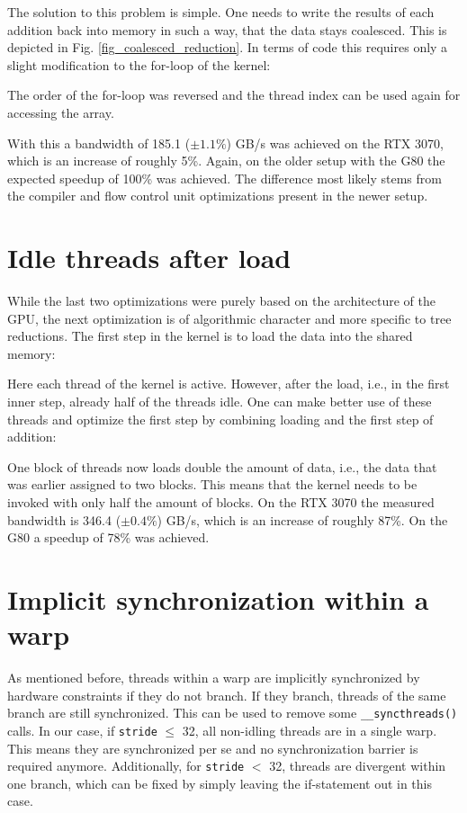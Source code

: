 The solution to this problem is simple.
One needs to write the results of each addition back into memory in such a way, that the data stays coalesced.
This is depicted in Fig. \ref{fig_coalesced_reduction}.
In terms of code this requires only a slight modification to the for-loop of the kernel:

The order of the for-loop was reversed and the thread index can be used again for accessing the array.

With this a bandwidth of 185.1 (\( \pm 1.1\% \)) GB/s was achieved on the RTX 3070, which is an increase of roughly 5\%.
Again, on the older setup with the G80 the expected speedup of 100\% was achieved.
The difference most likely stems from the compiler and flow control unit optimizations present in the newer setup.


\section{Idle threads after load}
While the last two optimizations were purely based on the architecture of the GPU, the next optimization is of algorithmic character and more specific to tree reductions.
The first step in the kernel is to load the data into the shared memory:

Here each thread of the kernel is active.
However, after the load, i.e., in the first inner step, already half of the threads idle.
One can make better use of these threads and optimize the first step by combining loading and the first step of addition:

One block of threads now loads double the amount of data, i.e., the data that was earlier assigned to two blocks.
This means that the kernel needs to be invoked with only half the amount of blocks.
On the RTX 3070 the measured bandwidth is 346.4 (\( \pm 0.4\% \)) GB/s, which is an increase of roughly 87\%.
On the G80 a speedup of 78\% was achieved.


\section{Implicit synchronization within a warp}
As mentioned before, threads within a warp are implicitly synchronized by hardware constraints if they do not branch.
If they branch, threads of the same branch are still synchronized.
This can be used to remove some \texttt{\_\_syncthreads()} calls.
In our case, if \texttt{stride} \(\le\) 32, all non-idling threads are in a single warp. 
This means they are synchronized per se and no synchronization barrier is required anymore.
Additionally, for \texttt{stride} \(<\) 32, threads are divergent within one branch, which can be fixed by simply leaving the if-statement out in this case.

